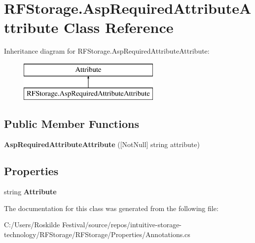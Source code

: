 \section{R\+F\+Storage.\+Asp\+Required\+Attribute\+Attribute Class Reference}
\label{class_r_f_storage_1_1_asp_required_attribute_attribute}
Inheritance diagram for R\+F\+Storage.\+Asp\+Required\+Attribute\+Attribute\+:\begin{figure}[H]
\begin{center}
\leavevmode
\includegraphics[height=2.000000cm]{class_r_f_storage_1_1_asp_required_attribute_attribute}
\end{center}
\end{figure}
\subsection*{Public Member Functions}
\begin{DoxyCompactItemize}
\item 
\mbox{\label{class_r_f_storage_1_1_asp_required_attribute_attribute_ae66f571bd587613e14c895427eb1db77}} 
{\bfseries Asp\+Required\+Attribute\+Attribute} ([Not\+Null] string attribute)
\end{DoxyCompactItemize}
\subsection*{Properties}
\begin{DoxyCompactItemize}
\item 
\mbox{\label{class_r_f_storage_1_1_asp_required_attribute_attribute_a619996dcc66e972bc41d767c600f0442}} 
string {\bfseries Attribute}\hspace{0.3cm}{\ttfamily  [get]}
\end{DoxyCompactItemize}


The documentation for this class was generated from the following file\+:\begin{DoxyCompactItemize}
\item 
C\+:/\+Users/\+Roskilde Festival/source/repos/intuitive-\/storage-\/technology/\+R\+F\+Storage/\+R\+F\+Storage/\+Properties/Annotations.\+cs\end{DoxyCompactItemize}
